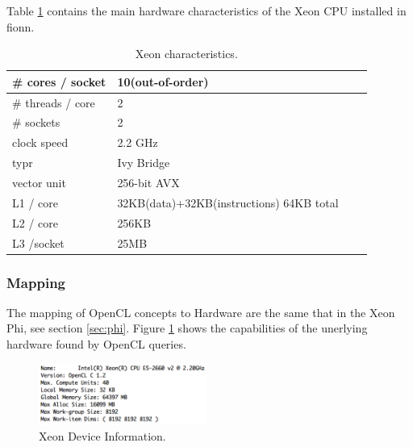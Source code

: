 \par{Table \ref{tab:xeon_arch} contains the main hardware characteristics of the
    Xeon CPU installed in fionn.}

\begin{table}[!h]
    \centering
    \begin{tabular}{| l | l | l | l |}
    \hline
    \# cores / socket& 10(out-of-order) \\ \hline
    \# threads / core& 2 \\ \hline
    \# sockets & 2 \\ \hline
    clock speed & 2.2 GHz \\ \hline
    typr & Ivy Bridge \\ \hline
    vector unit & 256-bit AVX \\ \hline
    L1 / core & 32KB(data)+32KB(instructions) 64KB total \\ \hline
    L2 / core & 256KB \\ \hline
    L3 /socket & 25MB \\ \hline
    \end{tabular}
    \caption{Xeon characteristics\cite{xeon_specs}.}
    \label{tab:xeon_arch}
\end{table}

\subsubsection{Mapping}

\par{The mapping of OpenCL concepts to Hardware are the same that in the Xeon 
    Phi, see section \ref{sec:phi}. Figure \ref{XeonDi} shows the capabilities of 
    the unerlying hardware found by OpenCL queries.}

\begin{figure}[!h]
    \centering
    \includegraphics[width=0.49\textwidth]{figures/xeon_di.png}
    \caption{Xeon Device Information.}
    \label{XeonDi}
\end{figure}

